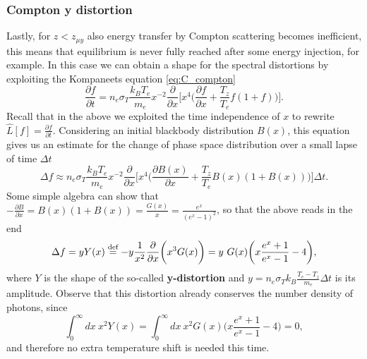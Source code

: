 \subsubsection{Compton y distortion}
Lastly, for $z<z_{\mu y}$ also energy transfer by Compton scattering becomes inefficient, this means that equilibrium is never fully reached after some energy injection, for example. In this case we can obtain a shape for the spectral distortions by exploiting the Kompaneets equation \eqref{eq:C_compton}
$$\frac{\partial f}{\partial t}=n_e\sigma_T\frac{k_BT_e}{m_e}x^{-2}\frac{\partial}{\partial x}\bigg[x^4\bigg(\frac{\partial f}{\partial x}+\frac{T_z}{T_e}f(1+f)\bigg)\bigg].$$ Recall that in the above we exploited the time independence of $x$ to rewrite $\hat{L}[f]=\frac{\partial f}{\partial t}.$
Considering an initial blackbody distribution $B(x)$, this equation gives us an estimate for the change of phase space distribution over a small lapse of time $\Delta t$ $$\Delta f\approx n_e\sigma_T\frac{k_BT_e}{m_e}x^{-2}\frac{\partial}{\partial x}\bigg[x^4\bigg(\frac{\partial B(x)}{\partial x}+\frac{T_z}{T_e}B(x)(1+B(x))\bigg)\bigg]\Delta t.$$
Some simple algebra can show that $-\frac{\partial B}{\partial x}=B(x)(1+B(x))=\frac{G(x)}{x}=\frac{e^x}{(e^x-1)^2}$, so that the above reads in the end
\begin{equation}
    \label{eq:SD_y_distortion}
    \Delta f=yY(x)\defeq -y\frac{1}{x^2}\frac{\partial}{\partial x}\bigg(x^3G(x)\bigg)=y\ G(x)\bigg(x\frac{e^x+1}{e^x-1}-4\bigg),
\end{equation}
where $Y$ is the shape of the so-called \textbf{y-distortion} and $y=n_e\sigma_Tk_B\frac{T_e-T_z}{m_e}\Delta t$ is its amplitude. Observe that this distortion already conserves the number density of photons, since
$$\int_0^\infty dx\ x^2Y(x)=\int_0^\infty dx\ x^2G(x)\bigg(x\frac{e^x+1}{e^x-1}-4\bigg)=0,$$
and therefore no extra temperature shift is needed this time.

